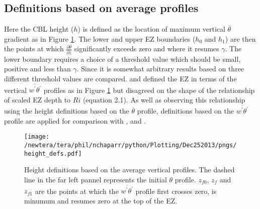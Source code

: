 \subsection{Definitions based on average profiles}

Here the CBL height ($h$) is defined as the location of maximum vertical $\overline{\theta}$ gradient as in Figure \ref{fig:hdefs}.  The lower and upper EZ boundaries ($h_{0}$ and $h_{1}$) are then the points at which $\frac{\partial \overline{\theta}}{\partial z}$ significantly exceeds zero and where it resumes $\gamma$.  The lower boundary requires a choice of a threshold value which should be small, positive and less than $\gamma$. Since it is somewhat arbitrary results based on three different threshold values are compared.  \cite{FedConzMir04} and \cite{BrooksFowler2} defined the EZ in terms of the vertical $\overline{w^{'}\theta^{'}}$ profiles as in Figure \ref{fig:hdefs} but disagreed on the shape of the relationship of scaled EZ depth to $Ri$ (equation 2.1).  As well as observing this relationship using the height definitions based on the $\overline{\theta}$ profile, definitions based on the $\overline{w^{'}\theta^{'}}$ profile are applied for comparison with \cite{BrooksFowler2}, \cite{FedConzMir04} and \cite{GarciaMellado}.\\  

\begin{figure}[htbp]
    \centering
    \texttt{[image: /newtera/tera/phil/nchaparr/python/Plotting/Dec252013/pngs/height\_defs.pdf]}
    \caption[Height Definitions]{Height definitions based on the average vertical profiles. The dashed line in the far left pannel represents the initial $\theta$ profile. $z_{f0}$, $z_{f}$ and $z_{f1}$ are the points at which the $\overline{w^{'}\theta^{'}}$ profile first crosses zero, is minumum and resumes zero at the top of the EZ.}
    \label{fig:hdefs}   %
\end{figure}

